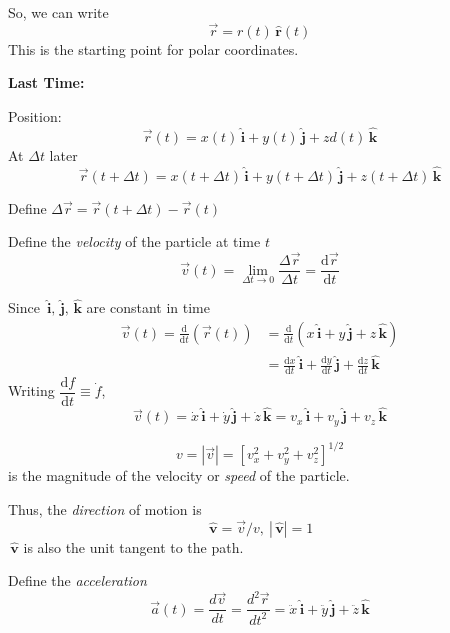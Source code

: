 \documentclass[twoside]{scrartcl}
\let\oldhat\hat
\renewcommand{\hat}[1]{\,\oldhat{\boldsymbol{\mathbf{#1}}}}
\begin{document}
 So, we can write 
 \[\vec{r} = r(t)\hat{r}(t)\]
 This is the starting point for polar coordinates.

 \textbf{Last Time:} 

\begin{center}
\end{center}

\setlength{\jot}{8pt}%

Position: 
\[\vec{r}(t) = x(t)\hat{i} + y(t)\hat{j} + zd(t)\hat{k}\]
At $\Delta t$ later
\[\vec{r}(t + \Delta t) = x(t + \Delta t)\hat{i} + y(t + \Delta t)\hat{j} + z(t + \Delta t)\hat{k}\]

\begin{definition}
Define $\Delta \vec{r} = \vec{r}(t + \Delta t) - \vec{r}(t)$

Define the \emph{velocity} of the particle at time $t$
\[\vec{v}(t) = \lim_{\Delta t \to 0} \frac{\Delta \vec{r}}{\Delta t} = \frac{\mathrm{d}\vec{r}}{\mathrm{d}t}\]
\end{definition}

Since $\hat{i},\hat{j},\hat{k}$ are constant in time
\[\begin{aligned}
	\vec{v}(t) = \frac{\mathrm{d}}{\mathrm{d}t}(\vec{r}(t)) &= \frac{\mathrm{d}}{\mathrm{d}t}(x \hat{i} + y\hat{j} + z\hat{k})\\
	&= \frac{\mathrm{d}x}{\mathrm{d}t}\hat{i} + \frac{\mathrm{d}y}{\mathrm{d}t}\hat{j} + \frac{\mathrm{d}z}{\mathrm{d}t}\hat{k}
\end{aligned}
\]
Writing $\dfrac{\mathrm{d}f}{\mathrm{d}t} \equiv \dot{f}$, \[\vec{v}(t) = \dot{x}\hat{i} + \dot{y}\hat{j} + \dot{z}\hat{k} = v_x\hat{i} + v_y\hat{j} + v_z\hat{k}\]

\begin{definition}
\[v = |\vec{v}| = [v_x^2 + v_y^2 + v_z^2]^{1/2}\]
is the magnitude of the velocity or \emph{speed} of the particle.

Thus, the \emph{direction} of motion is 
\[\hat{v} = \vec{v}/v,~ |\hat{v}| = 1\]
$\hat{v}$ is also the unit tangent to the path.

Define the \emph{acceleration}
\[\vec{a}(t) = \frac{d\vec{v}}{dt} = \frac{d^2\vec{r}}{dt^2} = \ddot{x}\hat{i} + \ddot{y}\hat{j} + \ddot{z}\hat{k}\]
\end{definition}
\end{document}
